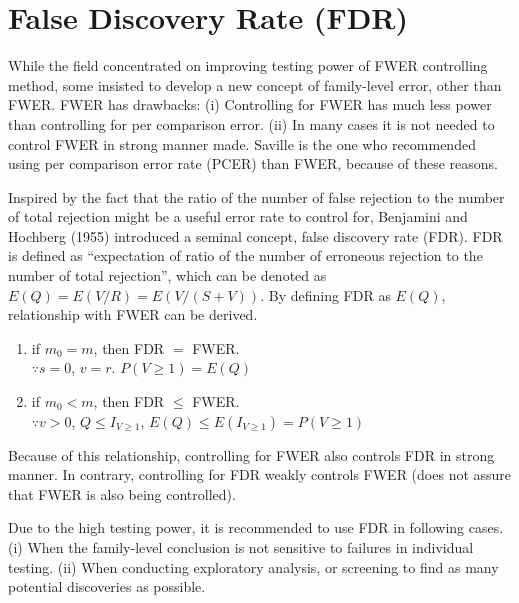 \documentclass[a4paper, 11pt, oneside]{article}
\begin{document}
\section{False Discovery Rate (FDR)}
While the field concentrated on improving testing power of FWER controlling method, some insisted to develop a new concept of family-level error, other than FWER. FWER has drawbacks: (i) Controlling for FWER has much less power than controlling for per comparison error. (ii) In many cases it is not needed to control FWER in strong manner made. Saville is the one who recommended using per comparison error rate (PCER) than FWER, because of these reasons. \par
    Inspired by the fact that the ratio of the number of false rejection to the number of total rejection might be a useful error rate to control for, Benjamini and Hochberg (1955) introduced a seminal concept, false discovery rate (FDR). FDR is defined as \enquote{expectation of ratio of the number of erroneous rejection to the number of total rejection}, which can be denoted as $E(Q)=E(V/R)=E(V/(S+V))$. By defining FDR as $E(Q)$, relationship with FWER can be derived.
    \begin{enumerate}
    \item if $m_0=m$, then FDR $=$ FWER. \\
      $\because s=0$, $v=r$. $P(V \geq 1)= E(Q)$
    \item if $m_0<m$, then FDR $\leq$ FWER. \\
      $\because v>0$, $Q \leq I_{V \geq 1}$, $E(Q) \leq E(I_{V \geq 1}) = P(V \geq 1)$
    \end{enumerate}
Because of this relationship, controlling for FWER also controls FDR in strong manner. In contrary, controlling for FDR weakly controls FWER (does not assure that FWER is also being controlled). \par
    Due to the high testing power, it is recommended to use FDR in following cases. (i) When the family-level conclusion is not sensitive to failures in individual testing. (ii) When conducting exploratory analysis, or screening to find as many potential discoveries as possible.
\end{document}
